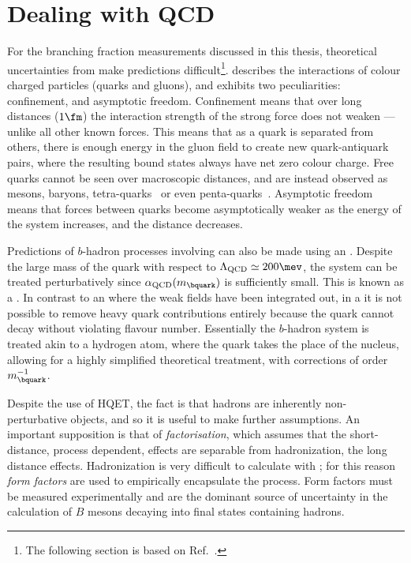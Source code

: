 \section{Dealing with QCD}

For the branching fraction measurements discussed in this thesis, theoretical uncertainties from \QCD make
predictions difficult\footnote{
  The following section is based on Ref.~\cite{Pich:1998xt}.
}.
\QCD describes the interactions of colour charged particles (quarks and
gluons),
and exhibits two peculiarities: confinement, and asymptotic freedom.
Confinement means that over long distances (\approx$1\fm$)
the interaction strength of the strong force does not weaken --- unlike all other known
forces.
This means that as a quark is separated from others, there is enough energy in the gluon field to
create new quark-antiquark pairs, where the resulting bound states always have net zero colour
charge.
Free quarks cannot be seen over macroscopic distances,
and are instead observed as mesons, baryons, tetra-quarks~\cite{LHCb-PAPER-2014-014} or
even penta-quarks~\cite{LHCb-PAPER-2015-029}.
Asymptotic freedom means that forces between quarks become asymptotically weaker as the energy of
the system increases, and the distance decreases.

Predictions of $b$-hadron processes involving \QCD can also be made using an \EFT.
Despite the large mass of the \bquark quark with respect to $\Lambda_\mathrm{QCD}\simeq200\mev$,
the system can be treated perturbatively since $\alpha_\mathrm{QCD}(m_\bquark)$ is sufficiently
small.
This is known as a \HQET.
In contrast to an \EFT where the weak fields have been integrated out, in a \HQET
it is not possible to remove heavy quark contributions entirely because the \bquark quark
cannot decay without violating flavour number.
Essentially the $b$-hadron system is treated akin to a hydrogen atom, where the \bquark quark takes
the place of the nucleus, allowing for a highly simplified theoretical treatment, with corrections
of order $m_\bquark^{-1}$.

Despite the use of \gls{HQET}, the fact is that hadrons are inherently non-perturbative objects,
and so it is useful to make further assumptions.
An important supposition is that of \emph{factorisation}, which assumes that the short-distance,
process dependent, \QCD effects are separable from hadronization, the long distance effects.
Hadronization is very difficult to calculate with \QCD; for this reason \emph{form factors} are
used to empirically encapsulate the process.
Form factors must be measured experimentally and are the dominant source of uncertainty in the
calculation of $B$ mesons decaying into final states containing hadrons.





